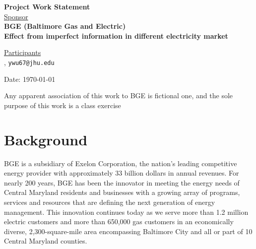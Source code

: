 \documentclass[12pt,letterpaper]{article}
\theoremstyle{definition}
\begin{document}
\def\shiftdowna{0.32in}  %
\def\shiftdownb{0.22in}  %


\begin{center}
\textbf{{\large Project Work Statement}}\\


\vspace \shiftdowna
\underline {Sponsor}\\ 
\vspace{5pt}
\textbf{{\large BGE (Baltimore Gas and Electric)}}\\


\vspace \shiftdowna
\textbf{{\large Effect from imperfect information in different electricity market}}


\vspace{0.35in}
\vspace \shiftdownb
\underline {Participants} \\
\vspace{5pt}
, \texttt{ywu67@jhu.edu}


\vspace \shiftdowna
Date: \today

\end{center}

\vfill  
\footnoterule
\noindent \small{Any apparent association of this work to BGE is
fictional one, and the sole purpose of this work is a class exercise}

\newpage

\section{Background} 
BGE is a subsidiary of Exelon Corporation, the nation's leading competitive energy provider with approximately 33 billion dollars in annual revenues. For nearly 200 years, BGE has been the innovator in meeting the energy needs of Central Maryland residents and businesses with a growing array of programs, services and resources that are defining the next generation of energy management. This innovation continues today as we serve more than 1.2 million electric customers and more than 650,000 gas customers in an economically diverse, 2,300-square-mile area encompassing Baltimore City and all or part of 10 Central Maryland counties.
\end{document}
